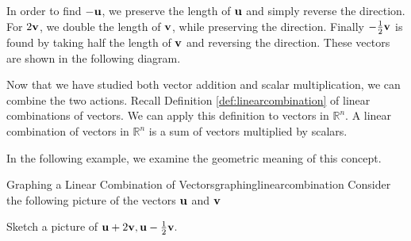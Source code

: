 \begin{solution}

In order to find $-{\bf u}$, we preserve the length of ${\bf u}$ and simply reverse the direction.
For $2{\bf v}$, we double the length of ${\bf v}$, while preserving the direction. Finally 
$-\frac{1}{2}{\bf v}$ is found by taking half the length of ${\bf v}$ and reversing the direction. 
These vectors are shown in the following diagram. 

\begin{center}
\end{center}

\end{solution}

Now that we have studied both vector addition and scalar multiplication, we can combine the two actions. Recall 
Definition \ref{def:linearcombination} of linear combinations of vectors. We can apply this definition to 
vectors in $\mathbb{R}^n$. A linear combination of vectors in $\mathbb{R}^n$ is a sum of vectors multiplied by scalars.

In the following example, we examine the geometric meaning of this concept. 

\begin{example}{Graphing a Linear Combination of Vectors}{graphinglinearcombination}
Consider the following picture of the vectors ${\bf u}$ and ${\bf v}$

\begin{center}
\end{center}

Sketch a picture of ${\bf u}+2{\bf v},{\bf u}-\frac{1}{2}{\bf v}.$
\end{example}

